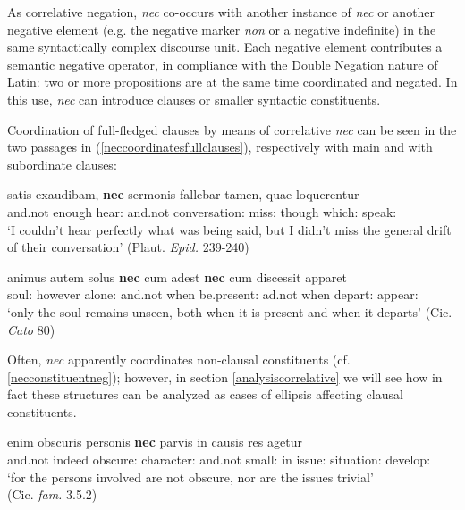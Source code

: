 \documentclass[output=paper,modfonts,nonflat,citecolor=brown,
showindex
]{langsci/langscibook}
\begin{document}
As correlative negation, {\em{nec}} co-occurs with another instance of {\em{nec}} or another negative element (e.g. the negative marker {\em{non}} or a negative indefinite) in the same syntactically complex discourse unit. Each negative element contributes a semantic negative operator, in compliance with the Double Negation nature of Latin: two or more propositions are at the same time coordinated and negated. In this use, {\em{nec}} can introduce clauses or smaller syntactic constituents. 

Coordination of full-fledged clauses by means of correlative {\em{nec}} can be seen in the two passages in (\ref{neccoordinatesfullclauses}), respectively with main and with subordinate clauses:

{\begin{exe}
\ex \label{neccoordinatesfullclauses}
\begin{xlist}
\ex {} satis exaudibam, {\bf{nec}} sermonis fallebar tamen, quae loquerentur\\
and.not enough hear:{} and.not conversation:{} miss:{} though which:{} speak:{} \\

`I couldn't hear perfectly what was being said, but I didn't miss the general drift of their conversation' (Plaut. {\em{Epid.}} 239-240)

\ex \gll animus autem solus {\bf{nec}} cum adest {\bf{nec}} cum discessit apparet\\
soul:{} however alone:{} and.not when be.present:{} ad.not when depart:{} appear:{}\\

`only the soul remains unseen, both when it is present and when it departs' (Cic. {\em{Cato}} 80)
\end{xlist}
\end{exe}}


\noindent Often, {\em{nec}} apparently coordinates non-clausal constituents (cf. \ref{necconstituentneg}); however, in section \ref{analysiscorrelative} we will see how in fact these structures can be analyzed as cases of ellipsis affecting clausal constituents. 

{\begin{exe}
\ex \label{necconstituentneg}  enim obscuris personis {\bf{nec}} parvis in causis res agetur\\
and.not indeed obscure:{} character:{} and.not small:{} in issue:{} situation:{} develop:{}\\

`for the persons involved are not obscure, nor are the issues trivial'\\(Cic. {\em{fam.}} 3.5.2)
\end{exe}}
\end{document}
